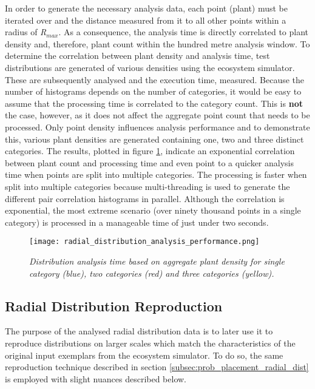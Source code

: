 In order to generate the necessary analysis data, each point (plant) must be iterated over and the distance measured from it to all other points within a radius of \textit{R$_{max}$}. As a consequence, the analysis time is directly correlated to plant density and, therefore, plant count within the hundred metre analysis window. To determine the correlation between plant density and analysis time, test distributions are generated of various densities using the ecosystem simulator. These are subsequently analysed and the execution time, measured. Because the number of histograms depends on the number of categories, it would be easy to assume that the processing time is correlated to the category count. This is \textbf{not} the case, however, as it does not affect the aggregate point count that needs to be processed. Only point density influences analysis performance and to demonstrate this, various plant densities are generated containing one, two and three distinct categories. The results, plotted in figure \ref{fig:analysis_perf}, indicate an exponential correlation between plant count and processing time and even point to a quicker analysis time when points are split into multiple categories. The processing is faster when split into multiple categories because multi-threading is used to generate the different pair correlation histograms in parallel. Although the correlation is exponential, the most extreme scenario (over ninety thousand points in a single category) is processed in a manageable time of just under two seconds. \\

\begin{figure}
\center
	\texttt{[image: radial\_distribution\_analysis\_performance.png]}
	\caption{ \textit{Distribution analysis time based on aggregate plant density for single category (blue), two categories (red) and three categories (yellow).}}	
	\label{fig:analysis_perf}
\end{figure}

\subsection{Radial Distribution Reproduction}

The purpose of the analysed radial distribution data is to later use it to reproduce distributions on larger scales which match the characteristics of the original input exemplars from the ecosystem simulator. To do so, the same reproduction technique described in section \ref{subsec:prob_placement_radial_dist} is employed with slight nuances described below.

